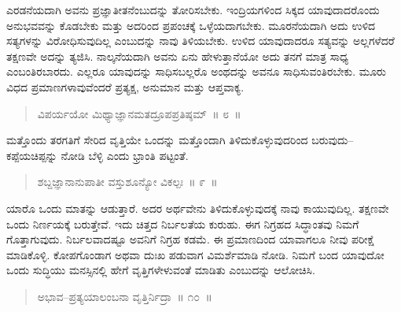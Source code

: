 ಎರಡನೆಯದಾಗಿ ಅವನು ಪ್ರಜ್ಞಾತೀತನೆಂಬುದನ್ನು ತೋರಿಸಬೇಕು. ಇಂದ್ರಿಯಗಳಿಂದ ಸಿಕ್ಕದ ಯಾವುದಾದರೊಂದು ಅನುಭವವನ್ನು ಕೊಡಬೇಕು ಮತ್ತು ಅದರಿಂದ ಪ್ರಪಂಚಕ್ಕೆ ಒಳ್ಳೆಯದಾಗಬೇಕು. ಮೂರನೆಯದಾಗಿ ಅದು ಉಳಿದ ಸತ್ಯಗಳನ್ನು ವಿರೋಧಿಸುವುದಿಲ್ಲ ಎಂಬುದನ್ನು ನಾವು ತಿಳಿಯಬೇಕು. ಉಳಿದ ಯಾವುದಾದರೂ ಸತ್ಯವನ್ನು ಅಲ್ಲಗಳೆದರೆ ತಕ್ಷಣವೇ ಅದನ್ನು ತ್ಯಜಿಸಿ. ನಾಲ್ಕನೆಯದಾಗಿ ಅವನು ಏನು ಹೇಳುತ್ತಾನೆಯೋ ಅದು ತನಗೆ ಮಾತ್ರ ಸಾಧ್ಯ ಎಂಬಂತಿರಬಾರದು. ಎಲ್ಲರೂ ಯಾವುದನ್ನು ಸಾಧಿಸಬಲ್ಲರೊ ಅಂಥದನ್ನು ಅವನೂ ಸಾಧಿಸುವಂತಿರಬೇಕು. ಮೂರು ವಿಧದ ಪ್ರಮಾಣಗಳಾವುವೆಂದರೆ ಪ್ರತ್ಯಕ್ಷ, ಅನುಮಾನ ಮತ್ತು ಆಪ್ತವಾಕ್ಯ.

\begin{verse}
ವಿಪರ್ಯಯೋ ಮಿಥ್ಯಾಜ್ಞಾನಮತದ್ರೂಪಪ್ರತಿಷ್ಠಮ್​~॥ ೮~॥
\end{verse}

\vspace{-0.3cm}


\vspace{0.2cm}

ಮತ್ತೊಂದು ತರಗತಿಗೆ ಸೇರಿದ ವೃತ್ತಿಯೇ ಒಂದನ್ನು ಮತ್ತೊಂದಾಗಿ ತಿಳಿದುಕೊಳ್ಳುವುದರಿಂದ ಬರುವುದು–ಕಪ್ಪೆಯಚಿಪ್ಪನ್ನು ನೋಡಿ ಬೆಳ್ಳಿ ಎಂದು ಭ್ರಾಂತಿ ಪಟ್ಟಂತೆ.

\begin{verse}
ಶಬ್ದಜ್ಞಾನಾನುಪಾತೀ ವಸ್ತುಶೂನ್ಯೋ ವಿಕಲ್ಪಃ~॥ ೯~॥
\end{verse}

\vspace{-0.3cm}


\vspace{0.2cm}

ಯಾರೊ ಒಂದು ಮಾತನ್ನು ಆಡುತ್ತಾರೆ. ಅದರ ಅರ್ಥವೇನು ತಿಳಿದುಕೊಳ್ಳುವುದಕ್ಕೆ ನಾವು ಕಾಯುವುದಿಲ್ಲ. ತಕ್ಷಣವೇ ಒಂದು ನಿರ್ಣಯಕ್ಕೆ ಬರುತ್ತೇವೆ. ಇದು ಚಿತ್ತದ ನಿರ್ಬಲತೆಯ ಕುರುಹು. ಈಗ ನಿಗ್ರಹದ ಸಿದ್ಧಾಂತವು ನಿಮಗೆ ಗೊತ್ತಾಗುವುದು. ನಿರ್ಬಲವಾದಷ್ಟೂ ಅವನಿಗೆ ನಿಗ್ರಹ ಕಡಮೆ. ಈ ಪ್ರಮಾಣದಿಂದ ಯಾವಾಗಲೂ ನೀವು ಪರೀಕ್ಷೆ ಮಾಡಿಕೊಳ್ಳಿ. ಕೋಪಗೊಂಡಾಗ ಅಥವಾ ದುಃಖ ಪಡುವಾಗ ವಿಮರ್ಶೆಮಾಡಿ ನೋಡಿ. ನಿಮಗೆ ಬಂದ ಯಾವುದೋ ಒಂದು ಸುದ್ಧಿಯು ಮನಸ್ಸಿನಲ್ಲಿ ಹೇಗೆ ವೃತ್ತಿಗಳೇಳುವಂತೆ ಮಾಡಿತು ಎಂಬುದನ್ನು ಆಲೋಚಿಸಿ.

\begin{verse}
ಅಭಾವ–ಪ್ರತ್ಯಯಾಲಂಬನಾ ವೃತ್ತಿರ್ನಿದ್ರಾ~॥ ೧೦~॥
\end{verse}

\vspace{-0.4cm}


\vspace{0.1cm}

